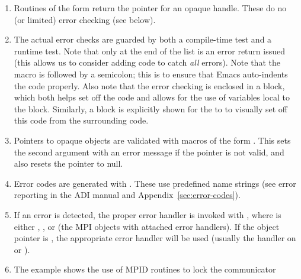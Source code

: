 \documentclass{article}
\begin{document}
\begin{enumerate}
\item Routines of the form  return the pointer
for an opaque handle.  These do no (or limited) error checking (see
 below).
\item The actual error checks are guarded by both a compile-time test and a
  runtime test.  Note that only at the end of the list is an error return
  issued (this allows us to consider adding code to catch \emph{all}
  errors).  Note that the macro  is
  followed by a semicolon; this is to ensure that Emacs auto-indents the
  code properly.
  Also note that the error checking is enclosed in a block, which
  both helps set off the code and allows for the use of variables
  local to the block.  Similarly, a block is explicitly shown for the
   to  to
  visually set off this code from the surrounding code.
%
\item Pointers to opaque objects are validated with macros of the
form .  This sets the second argument with an
error message if the pointer is not valid, and also resets the pointer
to null. 
\item Error codes are generated with .  These use
  predefined name strings (see error reporting in the ADI manual and
Appendix~\ref{sec:error-codes}). 
\item If an error is detected, the proper error handler is invoked
with , where  is either
, , or  (the MPI objects with attached
error handlers).  If the object pointer is , the
appropriate error handler will be used (usually the handler on
 or ).
\item The example shows the use of MPID routines to lock the communicator

\end{enumerate}
\end{document}
